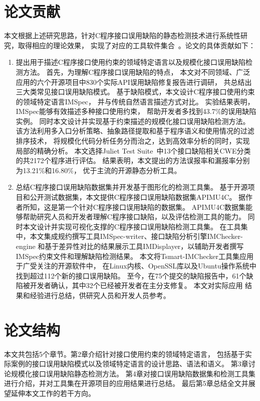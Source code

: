 \section{论文贡献}
本文根据上述研究思路，针对C程序接口误用缺陷的静态检测技术进行系统性研究，取得相应的理论效果，
实现了对应的工具软件集合~\cite{19-icse-imchecker, 19-tase-imspec, 19-compsac-empirical}。论文的具体贡献如下：

\begin{enumerate}
	\item 提出用于描述C程序接口使用约束的领域特定语言以及规模化接口误用缺陷检测方法。
	首先，为理解C程序接口误用缺陷的特点，
	本文对不同领域、广泛应用的六个开源项目中830个实际API误用缺陷修复报告进行调研，
	共总结出三大类常见接口误用缺陷模式。
	基于缺陷模式，本文设计C程序接口使用约束的领域特定语言IMSpec，
	并与传统自然语言描述方式对比。
	实验结果表明，IMSpec能够有效描述多种接口使用约束，
	帮助开发者多找到43.7\%的误用缺陷实例。
	同时本文设计并实现基于约束描述的规模化接口误用缺陷检测方法。
	该方法利用多入口分析策略、抽象路径提取和基于程序语义和使用情况的过滤排序技术，
	将规模化代码分析任务分而治之，达到高效率分析的同时，实现局部的精确分析。
	本文选择Juliet Test Suite~\cite{juliet}中13个接口缺陷相关CWE分类的共2172个程序进行评估。
	结果表明，本文提出的方法误报率和漏报率分别为13.21\%和16.80\%，
	优于主流的开源静态分析工具。
	
	\item 总结C程序接口误用缺陷数据集并开发基于图形化的检测工具集。
	基于开源项目和公开测试数据集，本文提供C程序接口误用缺陷数据集APIMU4C。
	据作者所知，这是第一个针对C程序接口误用缺陷的数据集。
	APIMU4C数据集能够帮助研究人员和开发者理解C程序接口缺陷，以及评估检测工具的能力。
	同时本文设计并实现可视化支撑的C程序接口误用缺陷检测工具集。
	在工具集中，本文集成规约撰写工具IMSpec-writer、接口缺陷分析引擎IMChecker-engine
	和基于差异性对比的结果展示工具IMDisplayer，以辅助开发者撰写IMSpec约束文件和理解缺陷检测结果。
	本文将Tsmart-IMChecker工具集应用于广受关注的开源软件中，
	在Linux内核、OpenSSL库以及Ubuntu操作系统中找到超过112个新的接口误用缺陷。
	至今，在75个提交的缺陷报告中，61个缺陷被开发者确认，其中32个已经被开发者在主分支修复。
	本文对实际应用 结果和经验进行总结，供研究人员和开发人员参考。
	
	
	
\end{enumerate}
\section{论文结构}
本文共包括5个章节。第2章介绍针对接口使用约束的领域特定语言，
包括基于实际案例的接口误用缺陷模式以及领域特定语言的设计思路、语法和语义。
第3章讨论规模化接口误用缺陷静态检测方法。
第4章对接口误用缺陷数据集和检测工具集进行介绍，并对工具集在开源项目的应用结果进行总结。
最后第5章总结全文并展望延伸本文工作的若干方向。
